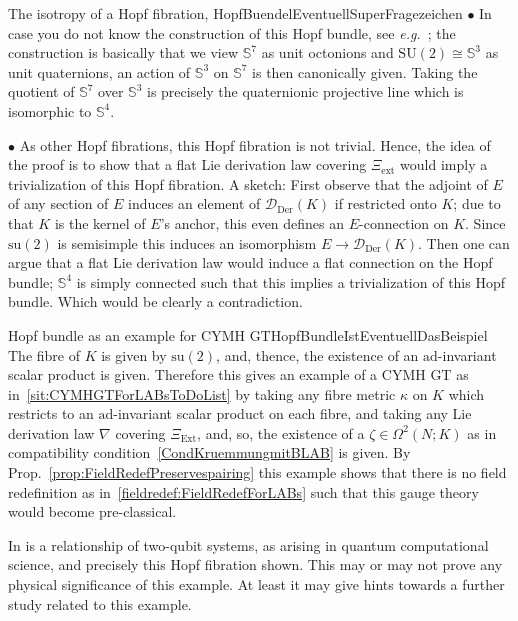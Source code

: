 \begin{examples}{The isotropy of a Hopf fibration, \newline \cite[Example 7.3.20; page 287]{mackenzieGeneralTheory}}{HopfBuendelEventuellSuperFragezeichen}
$\bullet$ In case you do not know the construction of this Hopf bundle, see \textit{e.g.}~\cite[Example 4.2.14; page 214ff.]{hamilton}; the construction is basically that we view $\mathds{S}^7$ as unit octonions and $\mathrm{SU}(2) \cong \mathds{S}^3$ as unit quaternions, an action of $\mathds{S}^3$ on $\mathds{S}^7$ is then canonically given. Taking the quotient of $\mathds{S}^7$ over $\mathds{S}^3$ is precisely the quaternionic projective line which is isomorphic to $\mathds{S}^4$.

$\bullet$ As other Hopf fibrations, this Hopf fibration is not trivial. Hence, the idea of the proof is to show that a flat Lie derivation law covering $\Xi_{\mathrm{ext}}$ would imply a trivialization of this Hopf fibration. A sketch: First observe that the adjoint of $E$ of any section of $E$ induces an element of $\mathcal{D}_{\mathrm{Der}}(K)$ if restricted onto $K$; due to that $K$ is the kernel of $E$'s anchor, this even defines an $E$-connection on $K$. Since $\mathrm{su}(2)$ is semisimple this induces an isomorphism $E \to \mathcal{D}_{\mathrm{Der}}(K)$. Then one can argue that a flat Lie derivation law would induce a flat connection on the Hopf bundle; $\mathds{S}^4$ is simply connected such that this implies a trivialization of this Hopf bundle. Which would be clearly a contradiction.
\end{examples}

\begin{remarks}{Hopf bundle as an example for CYMH GT}{HopfBundleIstEventuellDasBeispiel}
The fibre of $K$ is given by $\mathrm{su}(2)$, and, thence, the existence of an $\mathrm{ad}$-invariant scalar product is given. Therefore this gives an example of a CYMH GT as in~\ref{sit:CYMHGTForLABsToDoList} by taking any fibre metric $\kappa$ on $K$ which restricts to an $\mathrm{ad}$-invariant scalar product on each fibre, and taking any Lie derivation law $\nabla$ covering $\Xi_{\mathrm{Ext}}$, and, so, the existence of a $\zeta \in \Omega^2(N;K)$ as in compatibility condition~\eqref{CondKruemmungmitBLAB} is given. By Prop.~\ref{prop:FieldRedefPreservespairing} this example shows that there is no field redefinition as in~\ref{fieldredef:FieldRedefForLABs} such that this gauge theory would become pre-classical.

In \cite{TwoQubits} is a relationship of two-qubit systems, as arising in quantum computational science, and precisely this Hopf fibration shown. This may or may not prove any physical significance of this example. At least it may give hints towards a further study related to this example.
\end{remarks}

